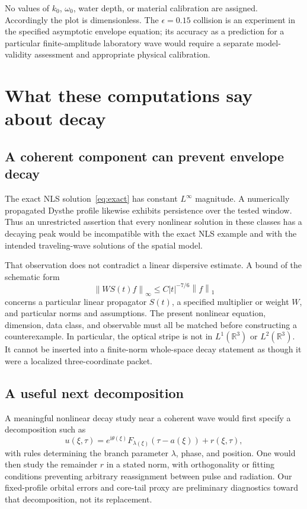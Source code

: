 \documentclass[10pt,letterpaper]{article}
\numberwithin{equation}{section}
\newcommand{\ii}{\mathrm{i}}
\newcommand{\R}{\mathbb R}
\newcommand{\norm}[1]{\left\|#1\right\|}
\begin{document}
No values of $k_0$, $\omega_0$, water depth, or material calibration are assigned. Accordingly the plot is dimensionless. The $\epsilon=0.15$ collision is an experiment in the specified asymptotic envelope equation; its accuracy as a prediction for a particular finite-amplitude laboratory wave would require a separate model-validity assessment and appropriate physical calibration.

\section{What these computations say about decay}
\subsection{A coherent component can prevent envelope decay}
The exact NLS solution~\eqref{eq:exact} has constant $L^\infty$ magnitude. A numerically propagated Dysthe profile likewise exhibits persistence over the tested window. Thus an unrestricted assertion that every nonlinear solution in these classes has a decaying peak would be incompatible with the exact NLS example and with the intended traveling-wave solutions of the spatial model.

That observation does not contradict a linear dispersive estimate. A bound of the schematic form
\begin{equation}
 \norm{W S(t)f}_{\infty}\leq C|t|^{-7/6}\norm f_1
\end{equation}
concerns a particular linear propagator $S(t)$, a specified multiplier or weight $W$, and particular norms and assumptions. The present nonlinear equation, dimension, data class, and observable must all be matched before constructing a counterexample. In particular, the optical stripe is not in $L^1(\R^3)$ or $L^2(\R^3)$. It cannot be inserted into a finite-norm whole-space decay statement as though it were a localized three-coordinate packet.

\subsection{A useful next decomposition}
A meaningful nonlinear decay study near a coherent wave would first specify a decomposition such as
\begin{equation}
 u(\xi,\tau)=e^{\ii\theta(\xi)}F_{\lambda(\xi)}(\tau-a(\xi))
                  +r(\xi,\tau),
\end{equation}
with rules determining the branch parameter $\lambda$, phase, and position. One would then study the remainder $r$ in a stated norm, with orthogonality or fitting conditions preventing arbitrary reassignment between pulse and radiation. Our fixed-profile orbital errors and core-tail proxy are preliminary diagnostics toward that decomposition, not its replacement.
\end{document}
